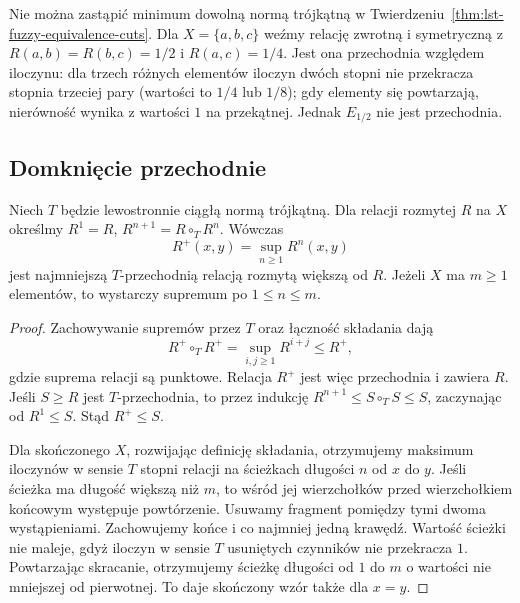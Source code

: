 Nie można zastąpić minimum dowolną normą trójkątną w
Twierdzeniu~\ref{thm:lst-fuzzy-equivalence-cuts}.
Dla $X=\{a,b,c\}$ weźmy relację zwrotną i symetryczną
z $R(a,b)=R(b,c)=1/2$ i $R(a,c)=1/4$.
Jest ona przechodnia względem iloczynu: dla trzech różnych
elementów iloczyn dwóch stopni nie przekracza stopnia
trzeciej pary (wartości to $1/4$ lub $1/8$); gdy elementy
się powtarzają, nierówność wynika z wartości $1$ na przekątnej.
Jednak $E_{1/2}$ nie jest przechodnia.

\subsection{Domknięcie przechodnie}

\begin{twierdzenie}\label{thm:lst-fuzzy-transitive-closure}
Niech $T$ będzie lewostronnie ciągłą normą trójkątną.
Dla relacji rozmytej $R$ na $X$ określmy $R^1=R$,
$R^{n+1}=R\circ_T R^n$. Wówczas
\[
 R^+(x,y)=\sup_{n\geq1}R^n(x,y)
\]
jest najmniejszą $T$-przechodnią relacją rozmytą większą od $R$.
Jeżeli $X$ ma $m\geq1$ elementów, to wystarczy supremum
po $1\leq n\leq m$.
\end{twierdzenie}
\begin{proof}
Zachowywanie supremów przez $T$ oraz łączność składania
dają
\[
 R^+\circ_T R^+=\sup_{i,j\geq1}R^{i+j}\leq R^+,
\]
gdzie suprema relacji są punktowe. Relacja $R^+$ jest
więc przechodnia i zawiera $R$. Jeśli $S\geq R$ jest
$T$-przechodnia, to przez indukcję
$R^{n+1}\leq S\circ_T S\leq S$, zaczynając od $R^1\leq S$.
Stąd $R^+\leq S$.

Dla skończonego $X$, rozwijając definicję składania,
otrzymujemy maksimum iloczynów w sensie $T$ stopni relacji
na ścieżkach długości $n$ od $x$ do $y$.
Jeśli ścieżka ma długość większą niż $m$, to wśród
jej wierzchołków przed wierzchołkiem końcowym występuje
powtórzenie. Usuwamy fragment pomiędzy tymi dwoma
wystąpieniami. Zachowujemy końce i co najmniej jedną
krawędź. Wartość ścieżki nie maleje, gdyż iloczyn w sensie
$T$ usuniętych czynników nie przekracza $1$.
Powtarzając skracanie, otrzymujemy ścieżkę długości
od $1$ do $m$ o wartości nie mniejszej od pierwotnej.
To daje skończony wzór także dla $x=y$.
\end{proof}

